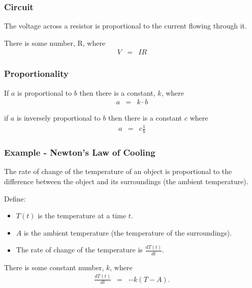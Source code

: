 \begin{frame}
  \frametitle{Circuit}
  
  The voltage across a resistor is proportional to the current flowing
  through it.

  {
    There is some number, R, where
    \begin{eqnarray*}
      V & = & IR
    \end{eqnarray*}
  }
\end{frame}

\begin{frame}
  \frametitle{Proportionality}
  
  If $a$ is proportional to $b$ then there is a constant, $k$, where 
  \begin{eqnarray*}
    a  & = & k \cdot b
  \end{eqnarray*}

  if $a$ is inversely proportional to $b$ then there is a constant $c$
  where 
  \begin{eqnarray*}
    a & = & c \frac{1}{b}
  \end{eqnarray*}
\end{frame}

\begin{frame}
  \frametitle{Example - Newton's Law of Cooling}

  The rate of change of the temperature of an object is proportional
  to the difference between the object and its surroundings (the
  ambient temperature).

  {

    Define:
    \begin{itemize}
    \item $T(t)$ is the temperature at a time $t$.
    \item $A$ is the ambient temperature (the temperature of the
      surroundings).
    \item The rate of change of the temperature is $\frac{dT(t)}{dt}$.
    \end{itemize}

  }

  {

    There is some constant number, $k$, where 
    \begin{eqnarray*}
      \frac{dT(t)}{dt} & = & -k (T-A).
    \end{eqnarray*}

  }


\end{frame}


